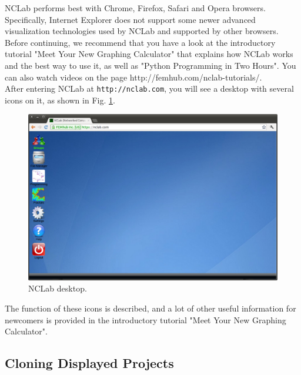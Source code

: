 \documentclass[article,A4,12pt]{llncs}
\begin{document}
\noindent
NCLab performs best 
with Chrome, Firefox, Safari and Opera browsers. Specifically, Internet Explorer
does not support some newer advanced visualization technologies used by NCLab 
and supported by other browsers. \\

\noindent
Before continuing, we recommend 
that you have a look at the introductory tutorial "Meet Your New Graphing 
Calculator" that explains how NCLab works and the best way to use it, as well as 
"Python Programming in Two Hours". You can also watch videos on the page 
http://femhub.com/nclab-tutorials/.\\

\noindent
After entering NCLab at {\tt http://nclab.com}, you will see a desktop with several icons on it,
as shown in Fig. \ref{fig:desktop}. 

\begin{figure}[!ht]
\begin{center}
\includegraphics[width=\textwidth]{img/desktop.png}
\end{center}
\caption{NCLab desktop.}
\label{fig:desktop}
\end{figure}
\newpage
\noindent
The function of these icons is described, and a lot of other useful information for newcomers 
is provided in the introductory tutorial "Meet Your New Graphing Calculator". \\

\subsection{Cloning Displayed Projects}
\end{document}
